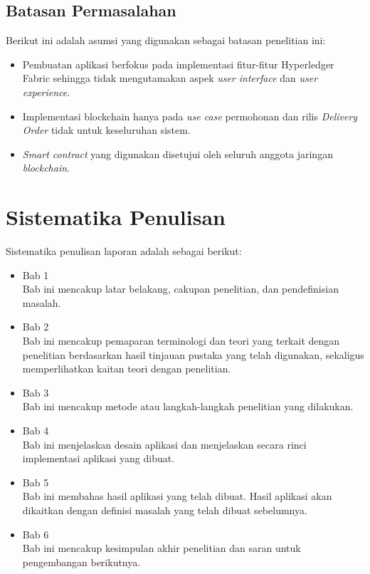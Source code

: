 \subsection{Batasan Permasalahan}
\label{sec:batasanMasalah}
Berikut ini adalah asumsi yang digunakan sebagai batasan penelitian ini:
\begin{itemize}
	\item Pembuatan aplikasi berfokus pada implementasi fitur-fitur Hyperledger Fabric sehingga tidak mengutamakan aspek \textit{user interface} dan \textit{user experience}.
	\item Implementasi blockchain hanya pada \textit{use case} permohonan dan rilis \textit{Delivery Order} tidak untuk keseluruhan sistem.
	\item \textit{Smart contract} yang digunakan disetujui oleh seluruh anggota jaringan \textit{blockchain}.

\end{itemize}


\section{Sistematika Penulisan}
\label{sec:sistematikaPenulisan}
Sistematika penulisan laporan adalah sebagai berikut:
\begin{itemize}
	\item Bab 1 \babSatu \\
	    Bab ini mencakup latar belakang, cakupan penelitian, dan pendefinisian masalah.
	\item Bab 2 \babDua \\
	    Bab ini mencakup pemaparan terminologi dan teori yang terkait dengan penelitian berdasarkan hasil tinjauan pustaka yang telah digunakan, sekaligus memperlihatkan kaitan teori dengan penelitian.
	\item Bab 3 \babTiga \\
	    Bab ini mencakup metode atau langkah-langkah penelitian yang dilakukan. 
	\item Bab 4 \babEmpat \\
		Bab ini menjelaskan desain aplikasi dan menjelaskan secara rinci implementasi aplikasi yang dibuat.
	\item Bab 5 \babLima \\
	    Bab ini membahas hasil aplikasi yang telah dibuat. Hasil aplikasi akan dikaitkan dengan definisi masalah yang telah dibuat sebelumnya.
	\item Bab 6 \kesimpulan \\
	    Bab ini mencakup kesimpulan akhir penelitian dan saran untuk pengembangan berikutnya.
\end{itemize}
